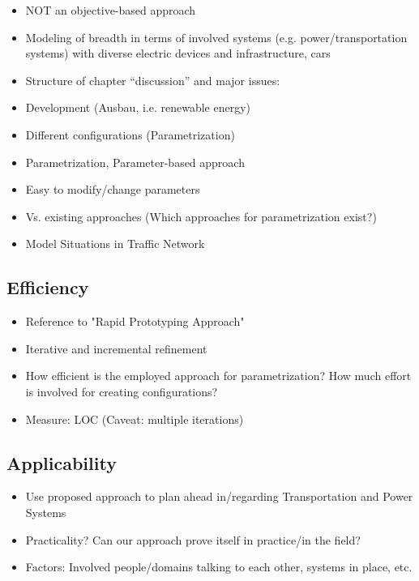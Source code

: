 \begin{itemize}
	\item NOT an objective-based approach
	\item Modeling of breadth in terms of involved systems (e.g. power/transportation systems) with diverse electric devices and infrastructure, cars
	\item Structure of chapter “discussion” and major issues:
	\item Development (Ausbau, i.e. renewable energy)
	\item Different configurations (Parametrization)
	\item Parametrization, Parameter-based approach
	\item Easy to modify/change parameters
	\item Vs. existing approaches (Which approaches for parametrization exist?)
	\item Model Situations in Traffic Network
\end{itemize}

\subsection{Efficiency}

\begin{itemize}
	\item Reference to "Rapid Prototyping Approach"
	\item Iterative and incremental refinement
	\item How efficient is the employed approach for parametrization? How much effort is involved for creating configurations?
	\item Measure: LOC (Caveat: multiple iterations)
\end{itemize}

\subsection{Applicability}

\begin{itemize}
	\item Use proposed approach to plan ahead in/regarding Transportation and Power Systems
	\item Practicality? Can our approach prove itself in practice/in the field?
	\item Factors: Involved people/domains talking to each other, systems in place, etc.
\end{itemize}